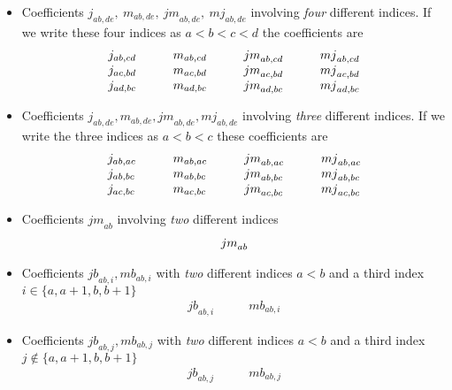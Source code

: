 \documentclass[12pt]{article}
\begin{document}
\begin{itemize}
\item Coefficients
${j}_{ab,de},\ {m}_{ab,de},\ {jm}_{ab,de},\ {mj}_{ab,de}$
involving \emph{four} different indices. If we write these four indices
as $a<b<c<d$ the coefficients are
\begin{equation}
\begin{array}{llll}
 {j}_{ab,cd}&\qquad {m}_{ab,cd}&\qquad {jm}_{ab,cd} &\qquad {mj}_{ab,cd}\cr
 {j}_{ac,bd}&\qquad {m}_{ac,bd}&\qquad {jm}_{ac,bd} &\qquad {mj}_{ac,bd}\cr
 {j}_{ad,bc}&\qquad {m}_{ad,bc}&\qquad {jm}_{ad,bc} &\qquad {mj}_{ad,bc}\cr
\end{array}
\label{ECa}
\end{equation}
\item Coefficients
${j}_{ab,de}, {m}_{ab,de}, {jm}_{ab,de}, {mj}_{ab,de}$ involving
\emph{three} different indices. If we write the three indices as
$a<b<c$ these coefficients are
\begin{equation}
\begin{array}{llll}
 {j}_{ab,ac}&\qquad {m}_{ab,ac}&\qquad {jm}_{ab,ac} &\qquad {mj}_{ab,ac}\cr
 {j}_{ab,bc}&\qquad {m}_{ab,bc}&\qquad {jm}_{ab,bc} &\qquad {mj}_{ab,bc}\cr
 {j}_{ac,bc}&\qquad {m}_{ac,bc}&\qquad {jm}_{ac,bc} &\qquad {mj}_{ac,bc}\cr
\end{array}
\label{ECb}
\end{equation}
\item Coefficients ${jm}_{ab}$
involving \emph{two} different indices
\begin{equation}
\begin{array}{l}
 {jm}_{ab} \cr
\end{array}
\label{ECc}
\end{equation}
\item Coefficients ${jb}_{ab, i}, {mb}_{ab, i}$ with \emph{two}
different indices $a<b$ and a third index $i \in \{a,a+1,b,b+1\}$
\begin{equation}
\begin{array}{ll}
 {jb}_{ab,i} &\qquad {mb}_{ab,i}
\end{array}
\label{ECd}
\end{equation}
\item Coefficients ${jb}_{ab, j}, {mb}_{ab, j}$ with \emph{two}
different indices $a<b$ and a third index $j \notin \{a,a+1,b,b+1\}$
\begin{equation}
\begin{array}{ll}
 {jb}_{ab,j} &\qquad {mb}_{ab,j}
\end{array}
\label{ECe}

\end{equation}
\end{itemize}
\end{document}
